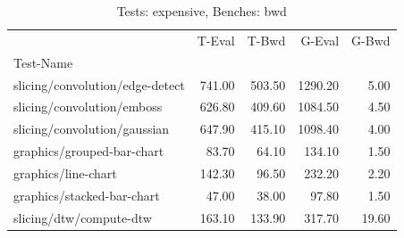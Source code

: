 \begin{table}
\caption{Tests: expensive, Benches: bwd}
\label{expensive-bwd}
\begin{tabular}{lrrrr}
\toprule
 & T-Eval & T-Bwd & G-Eval & G-Bwd \\
Test-Name &  &  &  &  \\
\midrule
slicing/convolution/edge-detect & 741.00 & 503.50 & 1290.20 & 5.00 \\
slicing/convolution/emboss & 626.80 & 409.60 & 1084.50 & 4.50 \\
slicing/convolution/gaussian & 647.90 & 415.10 & 1098.40 & 4.00 \\
graphics/grouped-bar-chart & 83.70 & 64.10 & 134.10 & 1.50 \\
graphics/line-chart & 142.30 & 96.50 & 232.20 & 2.20 \\
graphics/stacked-bar-chart & 47.00 & 38.00 & 97.80 & 1.50 \\
slicing/dtw/compute-dtw & 163.10 & 133.90 & 317.70 & 19.60 \\
\bottomrule
\end{tabular}
\end{table}
